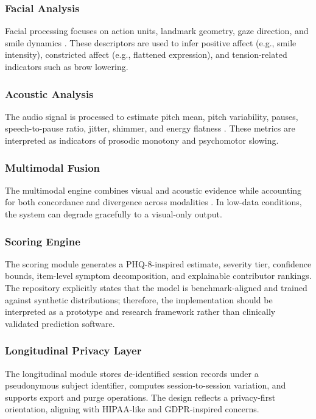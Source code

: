 \documentclass[conference, 12pt]{IEEEtran}
\begin{document}
\subsubsection{Facial Analysis}
Facial processing focuses on action units, landmark geometry, gaze direction, and smile dynamics \cite{ref4}. These descriptors are used to infer positive affect (e.g., smile intensity), constricted affect (e.g., flattened expression), and tension-related indicators such as brow lowering.

\subsubsection{Acoustic Analysis}
The audio signal is processed to estimate pitch mean, pitch variability, pauses, speech-to-pause ratio, jitter, shimmer, and energy flatness \cite{ref2}. These metrics are interpreted as indicators of prosodic monotony and psychomotor slowing.

\subsubsection{Multimodal Fusion}
The multimodal engine combines visual and acoustic evidence while accounting for both concordance and divergence across modalities \cite{ref5}. In low-data conditions, the system can degrade gracefully to a visual-only output.

\subsubsection{Scoring Engine}
The scoring module generates a PHQ-8-inspired estimate, severity tier, confidence bounds, item-level symptom decomposition, and explainable contributor rankings. The repository explicitly states that the model is benchmark-aligned and trained against synthetic distributions; therefore, the implementation should be interpreted as a prototype and research framework rather than clinically validated prediction software.

\subsubsection{Longitudinal Privacy Layer}

The longitudinal module stores de-identified session records under a pseudonymous subject identifier, computes session-to-session variation, and supports export and purge operations. The design reflects a privacy-first orientation, aligning with HIPAA-like and GDPR-inspired concerns.
\end{document}
